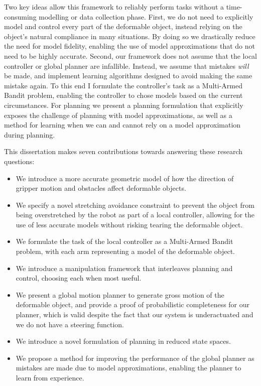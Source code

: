 Two key ideas allow this framework to reliably perform tasks without a time-consuming modelling or data collection phase. First, we do not need to explicitly model and control every part of the deformable object, instead relying on the object's natural compliance in many situations. By doing so we drastically reduce the need for model fidelity, enabling the use of model approximations that do not need to be highly accurate. Second, our framework does not assume that the local controller or global planner are infallible. Instead, we assume that mistakes \textit{will} be made, and implement learning algorithms designed to avoid making the same mistake again. To this end I formulate the controller's task as a Multi-Armed Bandit problem, enabling the controller to chose models based on the current circumstances. For planning we present a planning formulation that explicitly exposes the challenge of planning with model approximations, as well as a method for learning when we can and cannot rely on a model approximation during planning.

This dissertation makes seven contributions towards answering these research questions:
\begin{itemize}
 \item We introduce a more accurate geometric model of how the direction of gripper motion and obstacles affect deformable objects.
 \item We specify a novel stretching avoidance constraint to prevent the object from being overstretched by the robot as part of a local controller, allowing for the use of less accurate models without risking tearing the deformable object.
 \item We formulate the task of the local controller as a Multi-Armed Bandit problem, with each arm representing a model of the deformable object.
 \item We introduce a manipulation framework that interleaves planning and control, choosing each when most useful.
 \item We present a global motion planner to generate gross motion of the deformable object, and provide a proof of probabilistic completeness for our planner, which is valid despite the fact that our system is underactuated and we do not have a steering function.
 \item We introduce a novel formulation of planning in reduced state spaces.
 \item We propose a method for improving the performance of the global planner as mistakes are made due to model approximations, enabling the planner to learn from experience.
\end{itemize}
